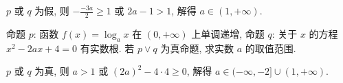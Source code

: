   \beginsolution
    $p$ 或 $q$ 为假, 则 $-\frac{-3a}2\geqslant 1$ 或 $2a-1>1$, 解得 $a\in(1,+\infty)$.
  \endsolution
  
  \begin{exercise}
    命题 $p$: 函数 $f(x)=\log_a x$ 在 $(0,+\infty)$ 上单调递增, 
    命题 $q$: 关于 $x$ 的方程 $x^2-2ax+4=0$ 有实数根.
    若 $p\vee q$ 为真命题, 求实数 $a$ 的取值范围.
  \end{exercise}

  \beginsolution
    $p$ 或 $q$ 为真, 则 $a>1$ 或 $(2a)^2-4\cdot 4\geqslant 0$, 解得 $a\in(-\infty,-2]\cup(1,+\infty)$.
  \endsolution
  
